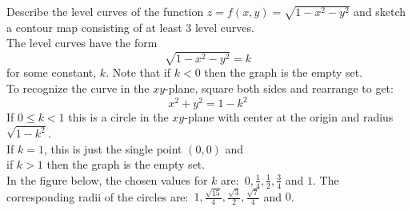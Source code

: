 \documentclass[handout]{ximera}
\begin{document}
\begin{example}[Example 3]
Describe the level curves of the function $z = f(x, y) = \sqrt{1-x^2 - y^2}$ and 
sketch a contour map consisting of at least 3 level curves.\\
The level curves have the form 
\[
\sqrt{1 - x^2 - y^2} = k
\]
for some constant, $k$. Note that if $k < 0$ then the graph is the empty set.\\
To recognize the curve in the $xy$-plane, square both sides and rearrange to get:
\[
x^2 + y^2 = 1- k^2 
\]
If $0 \leq k < 1$ this is a circle in the $xy$-plane with 
center at the origin and radius $\sqrt{1-k^2}$.\\
If $k = 1$, this is just the single point $(0, 0)$ and \\
if $k>1$ then the graph is the empty set.\\
In the figure below, the chosen values for $k$ are: $\,0, \frac14, \frac12, \frac 34$ and  $1$.
The corresponding radii of the 
circles are: $\,1, \frac{\sqrt{15}}{4}, \frac{\sqrt 3}{2}, \frac{\sqrt{7}}{4}$ and $0$.

\begin{image}
\end{image}

\end{example}
\end{document}

